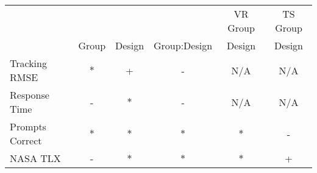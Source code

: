 \begin{tabular}{@{}lccc|cc@{}}
\toprule
                &       &        &              & VR Group & TS Group \\
                & Group & Design & Group:Design & Design   & Design   \\
\midrule
Tracking RMSE   & $*$ & +   &  -  & \small N/A & \small N/A \\
Response Time   &  -  & $*$  &  -  & \small N/A & \small N/A \\
Prompts Correct & $*$ & $*$ & $*$ & $*$ & - \\
NASA TLX        &  -  & $*$ & $*$  & $*$ & + \\
\bottomrule
\end{tabular}
